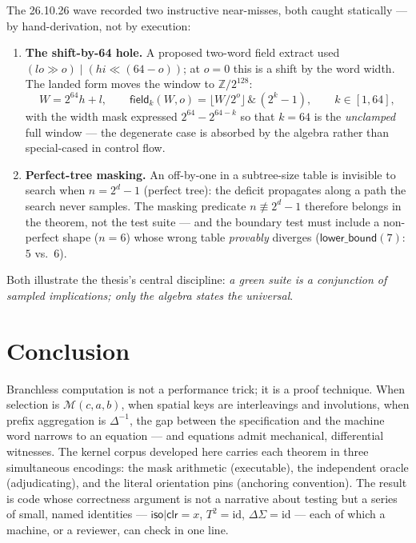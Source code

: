 \documentclass[11pt,a4paper]{report}
\newcommand{\mask}{\mathcal{M}}
\begin{document}
The 26.10.26 wave recorded two instructive near-misses, both caught
statically --- by hand-derivation, not by execution:

\begin{enumerate}
\item \textbf{The shift-by-64 hole.} A proposed two-word field extract
used $(lo \gg o) \;|\; (hi \ll (64 - o))$; at $o = 0$ this is a shift
by the word width. The landed form moves the window to $\mathbb{Z}/2^{128}$:
\begin{equation}
W = 2^{64} h + l, \qquad
\mathsf{field}_k(W, o) = \big\lfloor W / 2^{o} \big\rfloor \,\&\,
\left(2^{k} - 1\right), \qquad k \in [1, 64],
\end{equation}
with the width mask expressed $2^{64} - 2^{64-k}$ so that $k = 64$ is
the \emph{unclamped} full window --- the degenerate case is absorbed by
the algebra rather than special-cased in control flow.
\item \textbf{Perfect-tree masking.} An off-by-one in a subtree-size
table is invisible to search when $n = 2^{d} - 1$ (perfect tree): the
deficit propagates along a path the search never samples. The masking
predicate $n \not\equiv 2^{d} - 1$ therefore belongs in the theorem,
not the test suite --- and the boundary test must include a
non-perfect shape ($n = 6$) whose wrong table \emph{provably} diverges
($\mathsf{lower\_bound}(7)$: $5$ vs.\ $6$).
\end{enumerate}

Both illustrate the thesis's central discipline: \emph{a green suite
is a conjunction of sampled implications; only the algebra states the
universal}.

\chapter{Conclusion}

Branchless computation is not a performance trick; it is a proof
technique. When selection is $\mask(c,a,b)$, when spatial keys are
interleavings and involutions, when prefix aggregation is
$\Delta^{-1}$, the gap between the specification and the machine word
narrows to an equation --- and equations admit mechanical, differential
witnesses. The kernel corpus developed here carries each theorem in
three simultaneous encodings: the mask arithmetic (executable), the
independent oracle (adjudicating), and the literal orientation pins
(anchoring convention). The result is code whose correctness argument
is not a narrative about testing but a series of small, named
identities --- $\mathsf{iso} | \mathsf{clr} = x$, $T^2 = \mathrm{id}$,
$\Delta \Sigma = \mathrm{id}$ --- each of which a machine, or a
reviewer, can check in one line.
\end{document}
